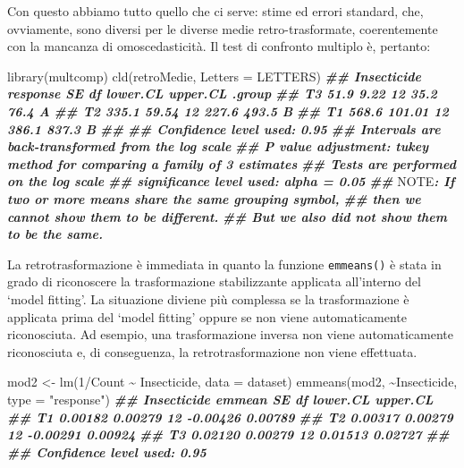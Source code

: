 \documentclass[
  12pt,
]{book}
\newenvironment{Shaded}{\begin{snugshade}}{\end{snugshade}}
\newcommand{\AlertTok}[1]{\textcolor[rgb]{0.94,0.16,0.16}{#1}}
\newcommand{\AttributeTok}[1]{\textcolor[rgb]{0.77,0.63,0.00}{#1}}
\newcommand{\DecValTok}[1]{\textcolor[rgb]{0.00,0.00,0.81}{#1}}
\newcommand{\DocumentationTok}[1]{\textcolor[rgb]{0.56,0.35,0.01}{\textbf{\textit{#1}}}}
\newcommand{\FunctionTok}[1]{\textcolor[rgb]{0.00,0.00,0.00}{#1}}
\newcommand{\NormalTok}[1]{#1}
\newcommand{\OtherTok}[1]{\textcolor[rgb]{0.56,0.35,0.01}{#1}}
\newcommand{\SpecialCharTok}[1]{\textcolor[rgb]{0.00,0.00,0.00}{#1}}
\newcommand{\StringTok}[1]{\textcolor[rgb]{0.31,0.60,0.02}{#1}}
\begin{document}
Con questo abbiamo tutto quello che ci serve: stime ed errori standard, che, ovviamente, sono diversi per le diverse medie retro-trasformate, coerentemente con la mancanza di omoscedasticità. Il test di confronto multiplo è, pertanto:

\begin{Shaded}
\begin{Highlighting}[]
\FunctionTok{library}\NormalTok{(multcomp)}
\FunctionTok{cld}\NormalTok{(retroMedie, }\AttributeTok{Letters =}\NormalTok{ LETTERS)}
\DocumentationTok{\#\#  Insecticide response     SE df lower.CL upper.CL .group}
\DocumentationTok{\#\#  T3              51.9   9.22 12     35.2     76.4  A    }
\DocumentationTok{\#\#  T2             335.1  59.54 12    227.6    493.5   B   }
\DocumentationTok{\#\#  T1             568.6 101.01 12    386.1    837.3   B   }
\DocumentationTok{\#\# }
\DocumentationTok{\#\# Confidence level used: 0.95 }
\DocumentationTok{\#\# Intervals are back{-}transformed from the log scale }
\DocumentationTok{\#\# P value adjustment: tukey method for comparing a family of 3 estimates }
\DocumentationTok{\#\# Tests are performed on the log scale }
\DocumentationTok{\#\# significance level used: alpha = 0.05 }
\DocumentationTok{\#\# }\AlertTok{NOTE}\DocumentationTok{: If two or more means share the same grouping symbol,}
\DocumentationTok{\#\#       then we cannot show them to be different.}
\DocumentationTok{\#\#       But we also did not show them to be the same.}
\end{Highlighting}
\end{Shaded}

La retrotrasformazione è immediata in quanto la funzione \texttt{emmeans()} è stata in grado di riconoscere la trasformazione stabilizzante applicata all'interno del `model fitting'. La situazione diviene più complessa se la trasformazione è applicata prima del `model fitting' oppure se non viene automaticamente riconosciuta. Ad esempio, una trasformazione inversa non viene automaticamente riconosciuta e, di conseguenza, la retrotrasformazione non viene effettuata.

\begin{Shaded}
\begin{Highlighting}[]
\NormalTok{mod2 }\OtherTok{\textless{}{-}} \FunctionTok{lm}\NormalTok{(}\DecValTok{1}\SpecialCharTok{/}\NormalTok{Count }\SpecialCharTok{\textasciitilde{}}\NormalTok{ Insecticide, }\AttributeTok{data =}\NormalTok{ dataset)}
\FunctionTok{emmeans}\NormalTok{(mod2, }\SpecialCharTok{\textasciitilde{}}\NormalTok{Insecticide, }\AttributeTok{type =} \StringTok{"response"}\NormalTok{)}
\DocumentationTok{\#\#  Insecticide  emmean      SE df lower.CL upper.CL}
\DocumentationTok{\#\#  T1          0.00182 0.00279 12 {-}0.00426  0.00789}
\DocumentationTok{\#\#  T2          0.00317 0.00279 12 {-}0.00291  0.00924}
\DocumentationTok{\#\#  T3          0.02120 0.00279 12  0.01513  0.02727}
\DocumentationTok{\#\# }
\DocumentationTok{\#\# Confidence level used: 0.95}
\end{Highlighting}
\end{Shaded}
\end{document}
